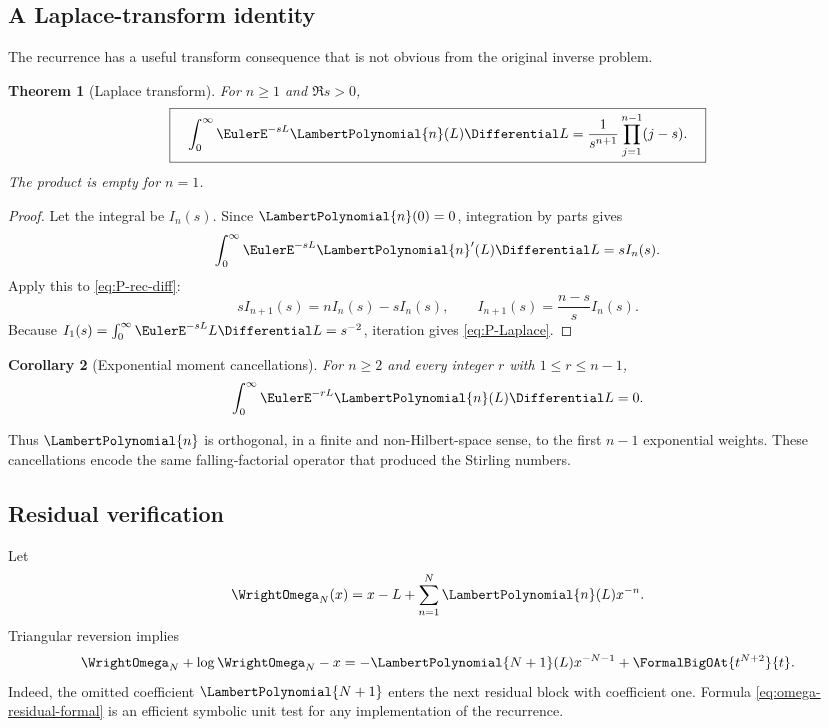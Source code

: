 \documentclass[11pt]{article}
\theoremstyle{pltheorem}
\newtheorem{theorem}{Theorem}[section]
\newtheorem{corollary}[theorem]{Corollary}
\begin{document}
\subsection{A Laplace-transform identity}

The recurrence has a useful transform consequence that is not obvious from the original inverse problem.

\begin{theorem}[Laplace transform]\label{thm:P-Laplace}
For \(n\ge1\) and \(\Re s>0\),
\begin{equation}\label{eq:P-Laplace}
 \boxed{\quad
 \int_0^\infty\EulerE^{-sL}\LambertPolynomial{n}(L)\Differential L
 =\frac{1}{s^{n+1}}\prod_{j=1}^{n-1}(j-s).
 \quad}
\end{equation}
The product is empty for \(n=1\).
\end{theorem}

\begin{proof}
Let the integral be \(I_n(s)\).  Since \(\LambertPolynomial{n}(0)=0\), integration by parts gives
\[
 \int_0^\infty\EulerE^{-sL}\LambertPolynomial{n}'(L)\Differential L=sI_n(s).
\]
Apply this to \cref{eq:P-rec-diff}:
\[
 sI_{n+1}(s)=nI_n(s)-sI_n(s),
 \qquad
 I_{n+1}(s)=\frac{n-s}{s}I_n(s).
\]
Because \(I_1(s)=\int_0^\infty\EulerE^{-sL}L\Differential L=s^{-2}\), iteration gives
\cref{eq:P-Laplace}.
\end{proof}

\begin{corollary}[Exponential moment cancellations]\label{cor:P-moment-zero}
For \(n\ge2\) and every integer \(r\) with \(1\le r\le n-1\),
\begin{equation}\label{eq:P-moment-zero}
 \int_0^\infty\EulerE^{-rL}\LambertPolynomial{n}(L)\Differential L=0.
\end{equation}
\end{corollary}

Thus \(\LambertPolynomial{n}\) is orthogonal, in a finite and non-Hilbert-space sense, to the first \(n-1\) exponential weights.  These cancellations encode the same falling-factorial operator that produced the Stirling numbers.

\subsection{Residual verification}

Let
\begin{equation}\label{eq:omega-trunc}
 \WrightOmega_N(x)=x-L+\sum_{n=1}^{N}\LambertPolynomial{n}(L)x^{-n}.
\end{equation}
Triangular reversion implies
\begin{equation}\label{eq:omega-residual-formal}
 \WrightOmega_N+\log\WrightOmega_N-x
 =-\LambertPolynomial{N+1}(L)x^{-N-1}+\FormalBigOAt{t^{N+2}}{t}.
\end{equation}
Indeed, the omitted coefficient \(\LambertPolynomial{N+1}\) enters the next residual block with coefficient one.  Formula \cref{eq:omega-residual-formal} is an efficient symbolic unit test for any implementation of the recurrence.
\end{document}
